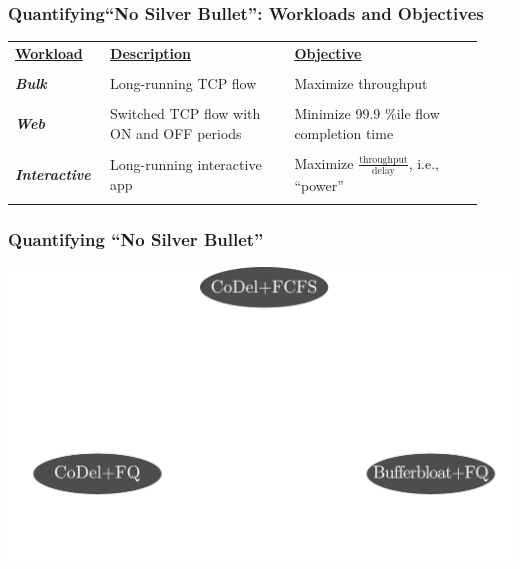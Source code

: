 \begin{frame}[plain]
\frametitle{Quantifying``No Silver Bullet'': Workloads and Objectives}

\begin{table}
\begin{tabular}{|p{0.18\linewidth}|p{0.37\linewidth}|p{0.38\linewidth}|}
\hline
{\bf \underline{Workload}} & {\bf \underline{Description}} & {\bf \underline{Objective}} \\
& &\\
\textbf{\emph{Bulk}} & Long-running TCP flow & Maximize throughput \\
& &\\
\textbf{\emph{Web}} & Switched TCP flow with ON and OFF periods &
Minimize 99.9 \%ile flow completion time \\
& &\\
\textbf{\emph{Interactive}} & Long-running interactive app & Maximize $\frac{\mbox{throughput}}{\mbox{delay}}$, i.e.,
  ``power'' \\ 
& &\\
\hline
\end{tabular}
\end{table}
\end{frame}

\begin{frame}[plain]
\frametitle{Quantifying ``No Silver Bullet''}
\begin{center}
\includegraphics[width=\columnwidth]{fig-6.pdf}
\end{center}
\end{frame}

